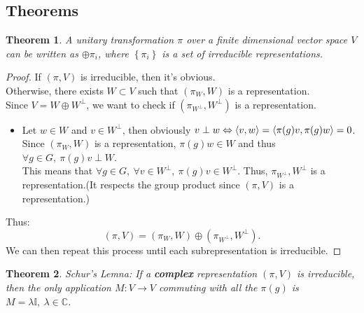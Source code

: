 \documentclass[11pt,a4paper]{article}
\newtheorem{theorem}{Theorem}[section]
\theoremstyle{definition}
\numberwithin{equation}{section}
\begin{document}
\subsection{Theorems}
\begin{theorem}
    A unitary transformation $\pi$ over a finite dimensional vector space $V$ can be written as $\oplus \pi_i $, where $\left\{\pi_i\right\}$ is a set of irreducible representations.
\end{theorem}
\begin{proof}
    If $(\pi,V)$ is irreducible, then it's obvious.\\
    Otherwise, there exists $W \subset V$ such that $(\pi_W,W)$ is a representation.  \\
    Since $V = W  \oplus W^\perp$, we want to check if $(\pi_{W^\perp},W^\perp)$ is a representation.
    \begin{itemize}
        \item Let $w \in W$ and $v \in W^\perp$, then obviously $v \perp w \Leftrightarrow \expval{v,w} = \expval{\pi(g)v,\pi(g)w}= 0$. Since $(\pi_W,W)$ is a representation, $\pi(g)w \in W$ and thus $\forall g \in G,\ \pi(g)v \perp W $. \\
        This means that $\forall g \in G,\ \forall v \in W^\perp,\ \pi(g)v \in W^\perp$. Thus, $\pi_{W^\perp},W^\perp$ is a representation.(It respects the group product since $(\pi,V)$ is a representation.)
    \end{itemize}
    Thus:\begin{equation*}
        (\pi,V) = (\pi_W,W)\oplus(\pi_{W^\perp},W^\perp).
    \end{equation*}
    We can then repeat this process until each subrepresentation is irreducible.
\end{proof}
\begin{theorem}{Schur's Lemna:}
    If a \textbf{complex} representation $(\pi,V)$ is irreducible, then the only application $M:V\rightarrow V$ commuting with all the $\pi(g)$ is $M = \lambda \mathbb{I},\ \lambda \in \mathbb{C}$. 
\end{theorem}
\end{document}
